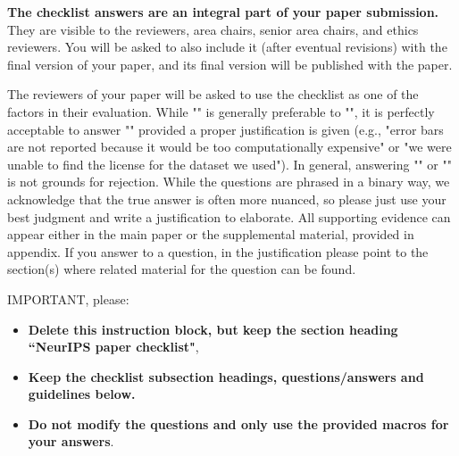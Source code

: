 \documentclass{article}
\begin{document}
{\bf The checklist answers are an integral part of your paper submission.} They are visible to the reviewers, area chairs, senior area chairs, and ethics reviewers. You will be asked to also include it (after eventual revisions) with the final version of your paper, and its final version will be published with the paper.

The reviewers of your paper will be asked to use the checklist as one of the factors in their evaluation. While "\answerYes{}" is generally preferable to "\answerNo{}", it is perfectly acceptable to answer "\answerNo{}" provided a proper justification is given (e.g., "error bars are not reported because it would be too computationally expensive" or "we were unable to find the license for the dataset we used"). In general, answering "\answerNo{}" or "\answerNA{}" is not grounds for rejection. While the questions are phrased in a binary way, we acknowledge that the true answer is often more nuanced, so please just use your best judgment and write a justification to elaborate. All supporting evidence can appear either in the main paper or the supplemental material, provided in appendix. If you answer \answerYes{} to a question, in the justification please point to the section(s) where related material for the question can be found.

IMPORTANT, please:
\begin{itemize}
    \item {\bf Delete this instruction block, but keep the section heading ``NeurIPS paper checklist"},
    \item  {\bf Keep the checklist subsection headings, questions/answers and guidelines below.}
    \item {\bf Do not modify the questions and only use the provided macros for your answers}.
\end{itemize} 
 

\end{document}
